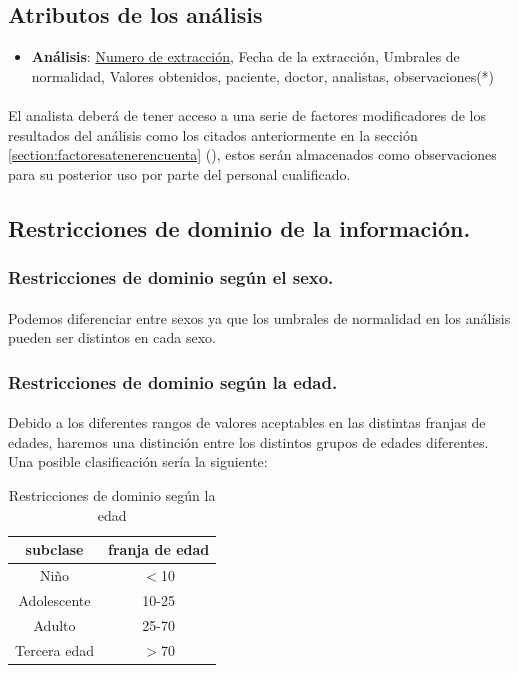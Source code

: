 \documentclass[a4paper,10pt]{article}
\begin{document}
\pagebreak

\subsection{Atributos de los análisis}
\begin{itemize}
\item {\bf Análisis}: \underline{Numero de extracción}, Fecha de la extracción, Umbrales de normalidad, Valores obtenidos, paciente, doctor, analistas, observaciones(*)
\end{itemize}

\paragraph{}
El analista deberá de tener acceso a una serie de factores modificadores de los resultados del análisis como los citados anteriormente en la sección
\ref{section:factoresatenerencuenta} (), estos serán almacenados como observaciones para su posterior uso por parte del personal cualificado.


\subsection{Restricciones de dominio de la información.}
\subsubsection{Restricciones de dominio según el sexo.}
\paragraph{}
Podemos diferenciar entre sexos ya que los umbrales de normalidad en los análisis pueden ser distintos en cada sexo.

\subsubsection{Restricciones de dominio según la edad.}
\paragraph{}
Debido a los diferentes rangos de valores aceptables en las distintas franjas de edades, haremos una distinción entre los distintos grupos de edades diferentes. Una posible clasificación sería la siguiente:
\begin{table}[hbt]
\begin{center}
\begin{tabular}{|c|c|}\hline
subclase & franja de edad \\ \hline
Niño & $<$10 \\ \hline
Adolescente & 10-25 \\ \hline
Adulto & 25-70 \\ \hline
Tercera edad & $>$70 \\ \hline
\end{tabular}
\caption{Restricciones de dominio según la edad}
\end{center}
\end{table}
\end{document}
